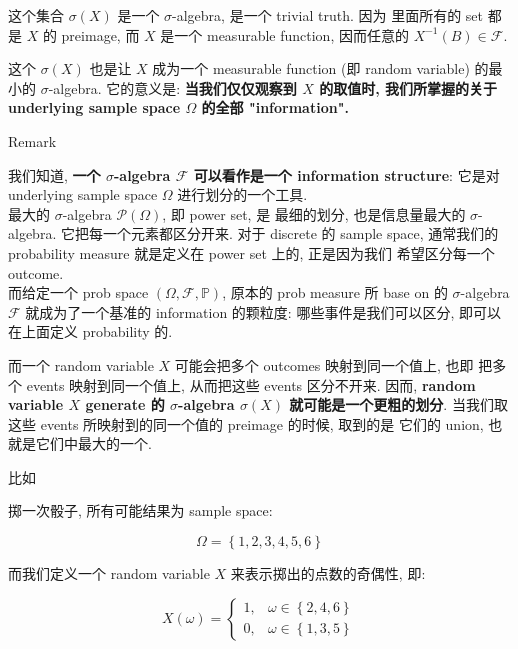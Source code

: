 \documentclass{qlnotes-export}
\begin{document}
这个集合 \(\sigma(X)\) 是一个 \(\sigma\)-algebra, 是一个 trivial truth. 因为 里面所有的 set 都是 \(X\) 的 preimage, 而 \(X\) 是一个 measurable function, 因而任意的 \(X^{- 1}(B) \in \mathcal{F}\).

这个 \(\sigma(X)\) 也是让 \(X\) 成为一个 measurable function (即 random variable) 的最小的 \(\sigma\)-algebra. 它的意义是: \textbf{当我们仅仅观察到 \(X\) 的取值时, 我们所掌握的关于 underlying sample space \(\Omega\) 的全部 "information".}

\begin{qlremark}{Remark}

我们知道, \textbf{一个 \(\sigma\)-algebra \(\mathcal{F}\) 可以看作是一个 information structure}: 它是对 underlying sample space \(\Omega\) 进行划分的一个工具.\\
最大的 \(\sigma\)-algebra \(\mathcal{P}(\Omega)\), 即 power set, 是 最细的划分, 也是信息量最大的 \(\sigma\)-algebra. 它把每一个元素都区分开来. 对于 discrete 的 sample space, 通常我们的 probability measure 就是定义在 power set 上的, 正是因为我们 希望区分每一个 outcome.\\
而给定一个 prob space \((\Omega,\mathcal{F},{\mathbb{P}})\), 原本的 prob measure 所 base on 的 \(\sigma\)-algebra \(\mathcal{F}\) 就成为了一个基准的 information 的颗粒度: 哪些事件是我们可以区分, 即可以在上面定义 probability 的.

而一个 random variable \(X\) 可能会把多个 outcomes 映射到同一个值上, 也即 把多个 events 映射到同一个值上, 从而把这些 events 区分不开来. 因而, \textbf{random variable \(X\) generate 的 \(\sigma\)-algebra \(\sigma(X)\) 就可能是一个更粗的划分}. 当我们取这些 events 所映射到的同一个值的 preimage 的时候, 取到的是 它们的 union, 也就是它们中最大的一个.

比如

\begin{example}\label{ex-02-random-variables-example-002}

掷一次骰子, 所有可能结果为 sample space:

\[\Omega = \left\{ {1,2,3,4,5,6} \right\}\]

而我们定义一个 random variable \(X\) 来表示掷出的点数的奇偶性, 即:

\[X(\omega) = \left\{ \begin{matrix}
{1,} & {\omega \in \left\{ {2,4,6} \right\}} \\
{0,} & {\omega \in \left\{ {1,3,5} \right\}}
\end{matrix} \right.\]


\end{example}
\end{qlremark}
\end{document}
